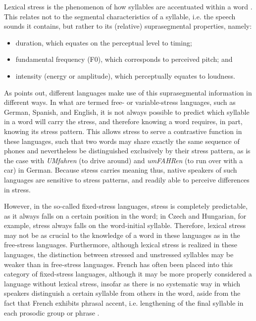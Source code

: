 			Lexical stress is the phenomenon of how syllables are accentuated within a word  \citep{Cutler2005}. This relates not to the segmental characteristics of a syllable, i.e. the speech sounds it contains, but rather to its (relative) suprasegmental properties, namely: %
			\begin{itemize}
			\item duration, which equates on the perceptual level to timing;
			\item fundamental frequency (F0), which corresponds to perceived pitch; and
			\item intensity (energy or amplitude), which perceptually equates to loudness.
			\end{itemize}

		
		
					As \textcite{Cutler2005} points out, different languages make use of this suprasegmental information in different ways.
			In what are termed free- or variable-stress languages, such as German, Spanish, and English, it is not always possible to predict which syllable in a word will carry the stress, and therefore knowing a word requires, in part, knowing its stress pattern. This allows stress to serve a contrastive function in these languages, such that two words may share exactly the same sequence of phones and nevertheless be distinguished exclusively by their stress pattern, as is the case with \textit{UMfahren} (to drive around) and \textit{umFAHRen} (to run over with a car) in German. %
Because stress carries meaning thus, native speakers of such languages are sensitive to stress patterns, and readily able to perceive differences in stress. %

			However, in the so-called fixed-stress languages, stress is completely predictable, as it always falls on a certain position in the word; in Czech and Hungarian, for example, stress always falls on the word-initial syllable. Therefore, lexical stress may not be as crucial to the knowledge of a word in these languages as in the free-stress languages. Furthermore, although lexical stress is realized in these languages, the distinction between stressed and unstressed syllables may be weaker than in free-stress languages. French has often been placed into this category of fixed-stress languages, although it may be more properly considered a language without lexical stress, insofar as there is no systematic way in which speakers distinguish a certain syllable from others in the word, aside from the fact that French exhibits phrasal accent, i.e. lengthening of the final syllable in each prosodic group or phrase \citep{Dupoux2008}. %
			
